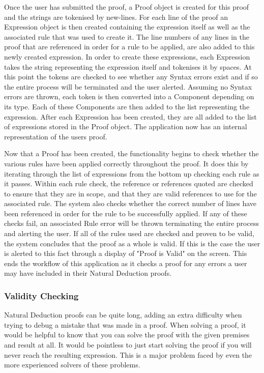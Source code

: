 Once the user has submitted the proof, a Proof object is created for this proof and the strings are tokenised by new-lines. For each line of the proof an Expression object is then created containing the expression itself as well as the associated rule that was used to create it. The line numbers of any lines in the proof that are referenced in order for a rule to be applied, are also added to this newly created expression. In order to create these expressions, each Expression takes the string representing the expression itself and tokenises it by spaces. At this point the tokens are checked to see whether any Syntax errors exist and if so the entire process will be terminated and the user alerted. Assuming no Syntax errors are thrown, each token is then converted into a Component depending on its type. Each of these Components are then added to the list representing the expression. After each Expression has been created, they are all added to the list of expressions stored in the Proof object. The application now has an internal representation of the users proof.

Now that a Proof has been created, the functionality begins to check whether the various rules have been applied correctly throughout the proof. It does this by iterating through the list of expressions from the bottom up checking each rule as it passes. Within each rule check, the reference or references quoted are checked to ensure that they are in scope, and that they are valid references to use for the associated rule. The system also checks whether the correct number of lines have been referenced in order for the rule to be successfully applied. If any of these checks fail, an associated Rule error will be thrown terminating the entire process and alerting the user. If all of the rules used are checked and proven to be valid, the system concludes that the proof as a whole is valid. If this is the case the user is alerted to this fact through a display of "Proof is Valid" on the screen. This ends the workflow of this application as it checks a proof for any errors a user may have included in their Natural Deduction proofs. 

\subsubsection{Validity Checking \label{validity}}
Natural Deduction proofs can be quite long, adding an extra difficulty when trying to debug a mistake that was made in a proof. When solving a proof, it would be helpful to know that you can solve the proof with the given premises and result at all. It would be pointless to just start solving the proof if you will never reach the resulting expression. This is a major problem faced by even the more experienced solvers of these problems.

